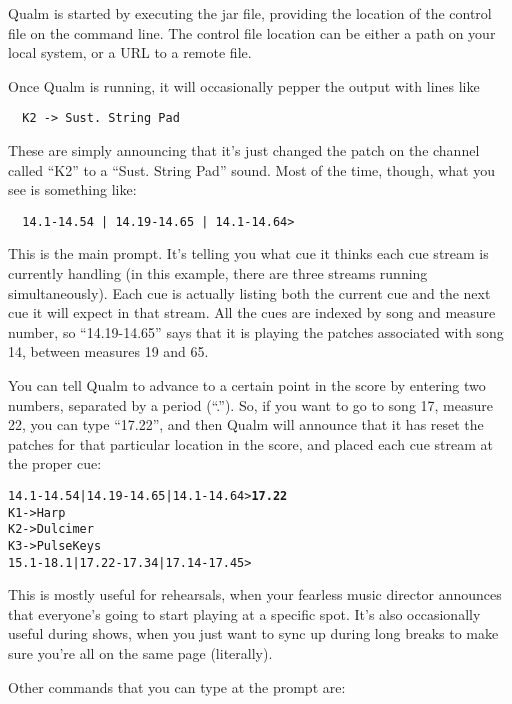 \documentclass{article}
\newcommand{\q}{{\textsf{Qualm}}\xspace}
\begin{document}
\q is started by executing the jar file, providing the location of the
control file on the command line.  The control file location can be
either a path on your local system, or a URL to a remote file.

Once \q is running, it will occasionally pepper the output with lines
like

\begin{verbatim}
  K2 -> Sust. String Pad
\end{verbatim}

These are simply announcing that it's just changed the patch on the
channel called ``K2'' to a ``Sust. String Pad'' sound.  Most of the time,
though, what you see is something like:

\begin{verbatim}
  14.1-14.54 | 14.19-14.65 | 14.1-14.64>
\end{verbatim}

This is the main prompt.  It's telling you what cue it thinks each cue
stream is currently handling (in this example, there are three
streams running simultaneously).  Each cue is actually listing both
the current cue and the next cue it will expect in that stream.  All
the cues are indexed by song and measure number, so ``14.19-14.65''
says that it is playing the patches associated with song 14, between
measures 19 and 65.

You can tell \q to advance to a certain point in the score by
entering two numbers, separated by a period (``.'').  So, if you want to
go to song 17, measure 22, you can type ``17.22'', and then \q will
announce that it has reset the patches for that particular location in
the score, and placed each cue stream at the proper cue:


\begin{alltt}
    14.1-14.54 | 14.19-14.65 | 14.1-14.64> \textbf{17.22}
    K1 -> Harp
    K2 -> Dulcimer
    K3 -> Pulse Keys
    15.1-18.1 | 17.22-17.34 | 17.14-17.45>
\end{alltt}

This is mostly useful for rehearsals, when your fearless music
director announces that everyone's going to start playing at a specific
spot.  It's also occasionally useful during shows, when you just want
to sync up during long breaks to make sure you're all on the same page
(literally).

Other commands that you can type at the prompt are:
\end{document}
